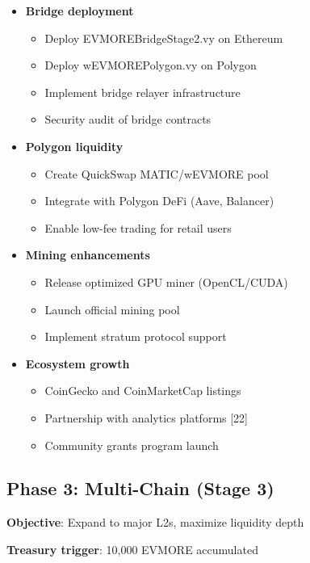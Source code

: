 \documentclass[11pt,a4paper]{article}
\begin{document}
\begin{itemize}
    \item \textbf{Bridge deployment}
    \begin{itemize}
        \item Deploy EVMOREBridgeStage2.vy on Ethereum
        \item Deploy wEVMOREPolygon.vy on Polygon
        \item Implement bridge relayer infrastructure
        \item Security audit of bridge contracts
    \end{itemize}
    \item \textbf{Polygon liquidity}
    \begin{itemize}
        \item Create QuickSwap MATIC/wEVMORE pool
        \item Integrate with Polygon DeFi (Aave, Balancer)
        \item Enable low-fee trading for retail users
    \end{itemize}
    \item \textbf{Mining enhancements}
    \begin{itemize}
        \item Release optimized GPU miner (OpenCL/CUDA)
        \item Launch official mining pool
        \item Implement stratum protocol support
    \end{itemize}
    \item \textbf{Ecosystem growth}
    \begin{itemize}
        \item CoinGecko and CoinMarketCap listings
        \item Partnership with analytics platforms [22]
        \item Community grants program launch
    \end{itemize}
\end{itemize}

\subsection{Phase 3: Multi-Chain (Stage 3)}

\textbf{Objective}: Expand to major L2s, maximize liquidity depth

\textbf{Treasury trigger}: 10,000 EVMORE accumulated
\end{document}
